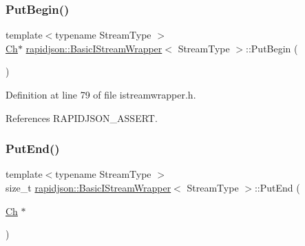 \mbox{\label{classrapidjson_1_1_basic_i_stream_wrapper_a5175c92fadc5278b215bad1822b62267}} 
\subsubsection{\texorpdfstring{PutBegin()}{PutBegin()}}
{\footnotesize\ttfamily template$<$typename Stream\+Type $>$ \\
\mbox{\hyperlink{classrapidjson_1_1_basic_i_stream_wrapper_a5fd972d8cd20b90ba0772aeebf122597}{Ch}}$\ast$ \mbox{\hyperlink{classrapidjson_1_1_basic_i_stream_wrapper}{rapidjson\+::\+Basic\+I\+Stream\+Wrapper}}$<$ Stream\+Type $>$\+::Put\+Begin (\begin{DoxyParamCaption}{ }\end{DoxyParamCaption})}



Definition at line 79 of file istreamwrapper.\+h.


\begin{DoxyCode}{0}

\end{DoxyCode}


References R\+A\+P\+I\+D\+J\+S\+O\+N\+\_\+\+A\+S\+S\+E\+RT.

\mbox{\label{classrapidjson_1_1_basic_i_stream_wrapper_a06939b6b8f349a611e6dd8ed82274a76}} 
\subsubsection{\texorpdfstring{PutEnd()}{PutEnd()}}
{\footnotesize\ttfamily template$<$typename Stream\+Type $>$ \\
size\+\_\+t \mbox{\hyperlink{classrapidjson_1_1_basic_i_stream_wrapper}{rapidjson\+::\+Basic\+I\+Stream\+Wrapper}}$<$ Stream\+Type $>$\+::Put\+End (\begin{DoxyParamCaption}\item[{\mbox{\hyperlink{classrapidjson_1_1_basic_i_stream_wrapper_a5fd972d8cd20b90ba0772aeebf122597}{Ch}} $\ast$}]{ }\end{DoxyParamCaption})}



